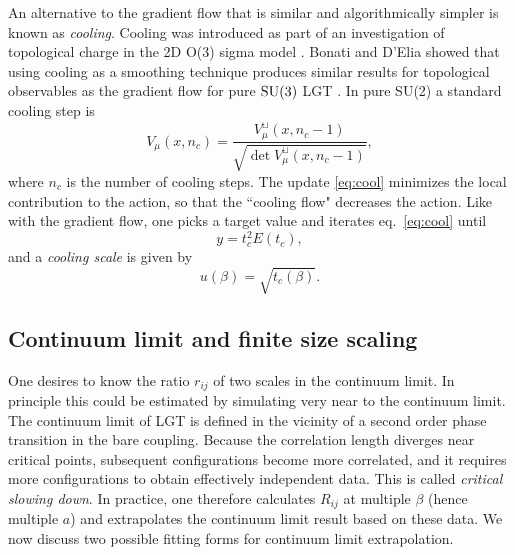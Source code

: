 An alternative to the gradient flow that is similar and 
algorithmically simpler is known as {\it cooling}. 
Cooling was introduced as part of an investigation of
topological charge in the 2D O(3) sigma model \cite{berg_dislocations_1981}.
Bonati and D'Elia showed that using cooling as a smoothing technique produces
similar results for topological observables as the gradient flow
for pure $\operatorname{SU}(3)$ LGT \cite{bonati_comparison_2014}.
In pure SU(2) a standard cooling step is
\begin{equation}\label{eq:cool}
  V_\mu(x,n_c)=\frac{V^\sqcup_\mu(x,n_c-1)}
                    {\sqrt{\det V_\mu^\sqcup(x,n_c-1)}},
\end{equation}
where $n_c$ is the number of cooling steps. 
The update \eqref{eq:cool} minimizes the local contribution to the
action, so that the ``cooling flow" decreases the action. Like with
the gradient flow, one picks a target value and iterates 
eq.~\eqref{eq:cool} until
\begin{equation}
  y=t_c^2 E(t_c),
\end{equation}
and a {\it cooling scale} is given by
\begin{equation}\label{eq:u}
  u(\beta)=\sqrt{t_c(\beta)}.
\end{equation}

\subsection{Continuum limit and finite size scaling}
\label{sec:sysa}

One desires to know the ratio $r_{ij}$ of two scales in
the continuum limit. In principle this could be estimated by simulating
very near to the continuum limit. 
The continuum limit of LGT is defined in the vicinity of a second order
phase transition in the bare coupling. Because the correlation length
diverges near critical points, subsequent configurations become more
correlated, and it requires more configurations to obtain effectively
independent data. This is called {\it critical slowing down}. 
In practice, one therefore calculates
$R_{ij}$ at multiple $\beta$ (hence multiple $a$) and extrapolates
the continuum limit result based on these data. We now discuss
two possible fitting forms for continuum limit extrapolation. 

